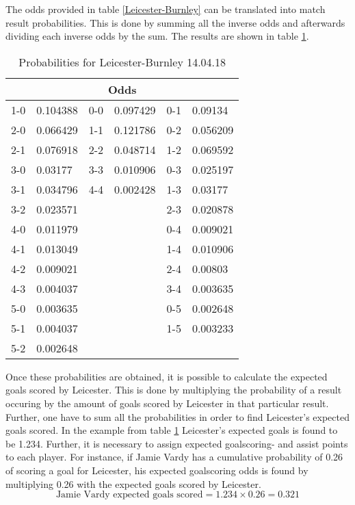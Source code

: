 The odds provided in table \ref{Leicester-Burnley} can be translated into match result probabilities. This is done by summing all the inverse odds and afterwards dividing each inverse odds by the sum. The results are shown in table \ref{Prob.Lei-Bur}.


\begin{table}[H]
\centering
\caption{Probabilities for Leicester-Burnley 14.04.18}
\label{Prob.Lei-Bur}
\begin{tabular}{|ll|ll|ll|}
\multicolumn{6}{c}{Odds}                         \\
\hline
1-0 & 0.104388 & 0-0 & 0.097429 & 0-1 & 0.09134  \\
2-0 & 0.066429 & 1-1 & 0.121786 & 0-2 & 0.056209 \\
2-1 & 0.076918 & 2-2 & 0.048714 & 1-2 & 0.069592 \\
3-0 & 0.03177  & 3-3 & 0.010906 & 0-3 & 0.025197 \\
3-1 & 0.034796 & 4-4 & 0.002428 & 1-3 & 0.03177  \\
3-2 & 0.023571 &     &          & 2-3 & 0.020878 \\
4-0 & 0.011979 &     &          & 0-4 & 0.009021 \\
4-1 & 0.013049 &     &          & 1-4 & 0.010906 \\
4-2 & 0.009021 &     &          & 2-4 & 0.00803  \\
4-3 & 0.004037 &     &          & 3-4 & 0.003635 \\
5-0 & 0.003635 &     &          & 0-5 & 0.002648 \\
5-1 & 0.004037 &     &          & 1-5 & 0.003233 \\
5-2 & 0.002648 &     &          &     &         \\
\hline
\end{tabular}
\end{table}

Once these probabilities are obtained, it is possible to calculate the expected goals scored by Leicester. This is done by multiplying the probability of a result occuring by the amount of goals scored by Leicester in that particular result. Further, one have to sum all the probabilities in order to find Leicester's expected goals scored. In the example from table \ref{Prob.Lei-Bur} Leicester's expected goals is found to be 1.234. 
\newpar
Further, it is necessary to assign expected goalscoring- and assist points to each player. For instance, if Jamie Vardy has a cumulative probability of 0.26 of scoring a goal for Leicester, his expected goalscoring odds is found by multiplying 0.26 with the expected goals scored by Leicester. 
\begin{equation*}
    \textrm{Jamie Vardy expected goals scored} = 1.234 \times 0.26 = 0.321
\end{equation*}

